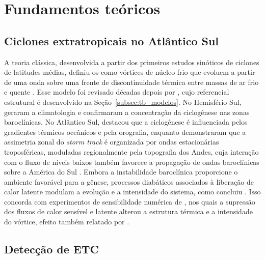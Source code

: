 \chapter{Fundamentos teóricos}\label{ch:theoretical_background}


\section{Ciclones extratropicais no Atlântico Sul}\label{sec:tb_fundamentos}

A teoria clássica, desenvolvida a partir dos primeiros estudos sinóticos de ciclones de latitudes médias, definiu-os como vórtices de núcleo frio que evoluem a partir de uma onda sobre uma frente de discontinuidade térmica entre massas de ar frio e quente \citep{bjerknes1922life}.
Esse modelo foi revisado décadas depois por \citet{shapiro1990life}, cujo referencial estrutural é desenvolvido na Seção~\ref{subsec:tb_modelos}.
No Hemisfério Sul, \citet{hoskins2005new} geraram a climatologia e confirmaram a concentração da ciclogênese nas zonas baroclínicas.
No Atlântico Sul, \citet{sinclair1995climatology} destacou que a ciclogênese é influenciada pelos gradientes térmicos oceânicos e pela orografia, enquanto \citet{inatsu2004zonal} demonstraram que a assimetria zonal do \textit{storm track} é organizada por ondas estacionárias troposféricas, moduladas regionalmente pela topografia dos Andes, cuja interação com o fluxo de níveis baixos também favorece a propagação de ondas baroclínicas sobre a América do Sul \citep{vera2002cold}.
Embora a instabilidade baroclínica proporcione o ambiente favorável para a gênese, processos diabáticos associados à liberação de calor latente modulam a evolução e a intensidade do sistema, como concluiu \citet{coutodesouza2024thesis}.
Isso concorda com experimentos de sensibilidade numérica de \citet{reboita2022from}, nos quais a supressão dos fluxos de calor sensível e latente alterou a estrutura térmica e a intensidade do vórtice, efeito também relatado por \citet{gozzo2013air}.

\section{Detecção de ETC}\label{sec:tb_vorticidad}

